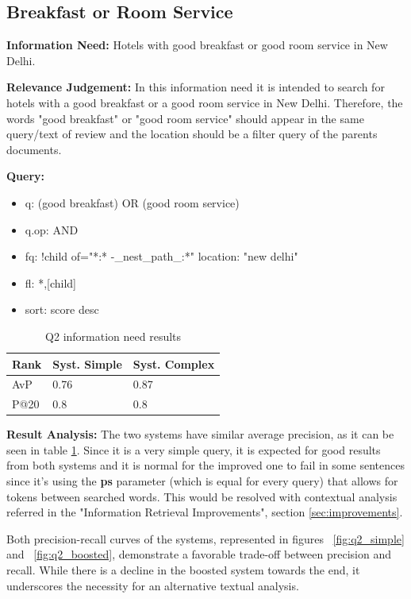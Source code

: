 \documentclass[sigconf]{acmart}
\begin{document}
\subsection{Breakfast or Room Service}\label{subsec:q2}


\textbf{Information Need:} Hotels with good breakfast or good room service in New Delhi.

\textbf{Relevance Judgement:} In this information need it is intended to search for hotels with a good breakfast or a good room service in New Delhi. Therefore, the words "good breakfast" or "good room service" should appear in the same query/text of review and the location should be a filter query of the parents documents.

\textbf{Query:}

\begin{itemize}
    \item q: (good breakfast) OR (good room service)
    \item q.op: AND
    \item fq: {!child of="*:* -\_nest\_path\_:*"} location: "new delhi"
    \item fl: *,[child]
    \item sort: score desc
\end{itemize}

\begin{table}[h]
\caption{Q2 information need results}
\label{tab:q2}
\begin{tabular}{lll}
\toprule
Rank & Syst. Simple & Syst. Complex\\
\midrule
AvP & 0.76 & 0.87  \\
P@20 & 0.8 & 0.8 \\
\bottomrule
\end{tabular}
\end{table}

\textbf{Result Analysis:}\label{ra_q2} The two systems have similar average precision, as it can be seen in table \ref{tab:q2}. Since it is a very simple query, it is expected for good results from both systems and it is normal for the improved one to fail in some sentences since it's using the \textbf{ps} parameter (which is equal for every query) that allows for tokens between searched words. This would be resolved with contextual analysis referred in the "Information Retrieval Improvements", section \ref{sec:improvements}.

Both precision-recall curves of the systems, represented in figures ~\ref{fig:q2_simple} and ~\ref{fig:q2_boosted}, demonstrate a favorable trade-off between precision and recall. While there is a decline in the boosted system towards the end, it underscores the necessity for an alternative textual analysis.
\end{document}
